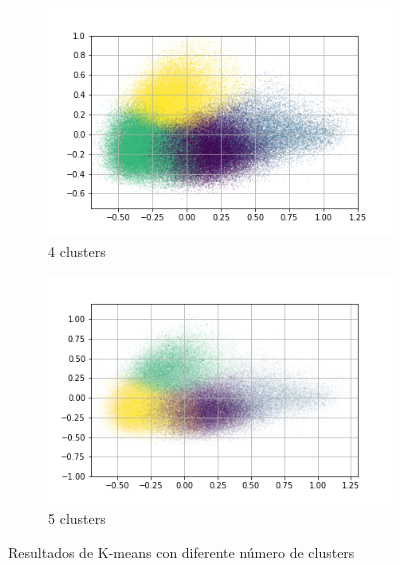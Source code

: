 \begin{figure}
\begin{subfigure}[b]{0.4\textwidth}
         \includegraphics[width=\textwidth]{results/TopicDetection/es/PCA_4.png}
         \caption{4 clusters}
         \label{fig:es_kmeans_4}
     \end{subfigure}
     \hfill
     \begin{subfigure}[b]{0.4\textwidth}
         \centering
         \includegraphics[width=\textwidth]{results/TopicDetection/es/PCA_5.png}
         \caption{5 clusters}
         \label{fig:es_kmeans_5}
     \end{subfigure}
        \caption{Resultados de K-means con diferente número de clusters}
        \label{fig:es_kmeans}
\end{figure}




